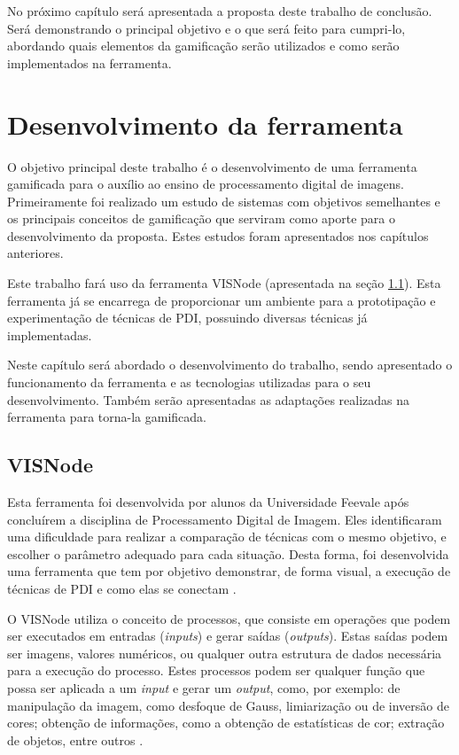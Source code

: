 \documentclass[
	12pt,				%
	oneside,			%
	a4paper,			%
	english,			%
	french,				%
	spanish,			%
	brazil,				%
	]{abntex2}
\begin{document}
No próximo capítulo será apresentada a proposta deste trabalho de conclusão. Será demonstrando o principal objetivo e o que será feito para cumpri-lo, abordando quais elementos da gamificação serão utilizados e como serão implementados na ferramenta.

\chapter{Desenvolvimento da ferramenta} 

O objetivo principal deste trabalho é o desenvolvimento de uma ferramenta gamificada para o auxílio ao ensino de processamento digital de imagens. Primeiramente foi realizado um estudo de sistemas com objetivos semelhantes e os principais conceitos de gamificação que serviram como aporte para o desenvolvimento da proposta. Estes estudos foram apresentados nos capítulos anteriores.
    
Este trabalho fará uso da ferramenta VISNode (apresentada na seção \ref{sec:visnode}). Esta ferramenta já se encarrega de proporcionar um ambiente para a prototipação e experimentação de técnicas de PDI, possuindo diversas técnicas já implementadas. 

Neste capítulo será abordado o desenvolvimento do trabalho, sendo apresentado o funcionamento da ferramenta e as tecnologias utilizadas para o seu desenvolvimento. Também serão apresentadas as adaptações realizadas na ferramenta para torna-la gamificada.
   
\section{VISNode}
\label{sec:visnode}

Esta ferramenta foi desenvolvida por alunos da Universidade Feevale após concluírem a disciplina de Processamento Digital de Imagem. Eles identificaram uma dificuldade para realizar a comparação de técnicas com o mesmo objetivo, e escolher o parâmetro adequado para cada situação. Desta forma, foi desenvolvida uma ferramenta que tem por objetivo demonstrar, de forma visual,  a execução de técnicas de PDI e como elas se conectam \cite{visnode}.

O VISNode utiliza o conceito de processos, que consiste em operações que podem ser executados em entradas (\textit{inputs}) e gerar saídas (\textit{outputs}). Estas saídas podem ser imagens, valores numéricos, ou qualquer outra estrutura de dados necessária para a execução do processo. Estes processos podem ser qualquer função que possa ser aplicada a um \textit{input} e gerar um \textit{output}, como, por exemplo: de manipulação da imagem, como desfoque de Gauss, limiarização ou de inversão de cores; obtenção de informações, como a obtenção de estatísticas de cor;  extração de objetos, entre outros \cite{visnode}.
\end{document}
